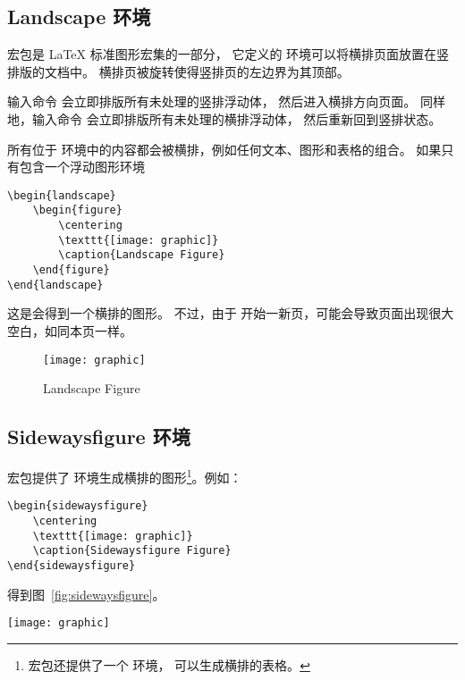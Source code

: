 \subsection{Landscape 环境}\label{ssec:landscape}

 宏包是 \LaTeX{} 标准图形宏集的一部分，
它定义的  环境可以将横排页面放置在竖排版的文档中。
横排页被旋转使得竖排页的左边界为其顶部。

输入命令  会立即排版所有未处理的竖排浮动体，
然后进入横排方向页面。
同样地，输入命令  会立即排版所有未处理的横排浮动体，
然后重新回到竖排状态。

所有位于  环境中的内容都会被横排，例如任何文本、图形和表格的组合。
如果只有包含一个浮动图形环境
\begin{lstlisting}
\begin{landscape}
	\begin{figure}
		\centering
		\texttt{[image: graphic]}
		\caption{Landscape Figure}
	\end{figure}
\end{landscape}
\end{lstlisting}
这是会得到一个横排的图形。
不过，由于  开始一新页，可能会导致页面出现很大空白，如同本页一样。

\begin{landscape} 
	\begin{figure} 
		\centering
		\texttt{[image: graphic]}
		\caption{Landscape Figure}\label{fig:landscape}
	\end{figure} 
\end{landscape}

\subsection{Sidewaysfigure 环境}\label{ssec:sidewaysfigure}

 宏包提供了  环境生成横排的图形\footnote{
	 宏包还提供了一个  环境，
	可以生成横排的表格。}。例如：
\begin{lstlisting}
\begin{sidewaysfigure}
	\centering
	\texttt{[image: graphic]}
	\caption{Sidewaysfigure Figure}
\end{sidewaysfigure}
\end{lstlisting}
得到图~\ref{fig:sidewaysfigure}。

\begin{sidewaysfigure}
	\centering
	\texttt{[image: graphic]}
	\caption{Sidewaysfigure Figure}\label{fig:sidewaysfigure}
\end{sidewaysfigure}


